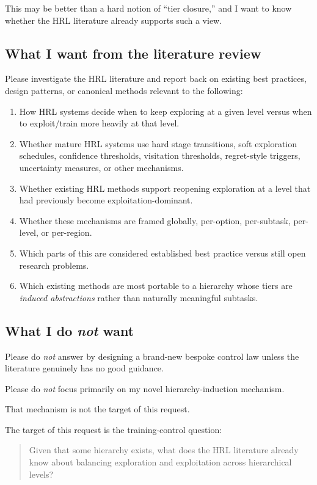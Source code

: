 \documentclass[11pt]{article}
\begin{document}
This may be better than a hard notion of ``tier closure,'' and I want to know whether the HRL literature already supports such a view.

\subsection*{What I want from the literature review}

Please investigate the HRL literature and report back on existing best practices, design patterns, or canonical methods relevant to the following:

\begin{enumerate}
\item How HRL systems decide when to keep exploring at a given level versus when to exploit/train more heavily at that level.
\item Whether mature HRL systems use hard stage transitions, soft exploration schedules, confidence thresholds, visitation thresholds, regret-style triggers, uncertainty measures, or other mechanisms.
\item Whether existing HRL methods support reopening exploration at a level that had previously become exploitation-dominant.
\item Whether these mechanisms are framed globally, per-option, per-subtask, per-level, or per-region.
\item Which parts of this are considered established best practice versus still open research problems.
\item Which existing methods are most portable to a hierarchy whose tiers are \emph{induced abstractions} rather than naturally meaningful subtasks.
\end{enumerate}

\subsection*{What I do \emph{not} want}

Please do \emph{not} answer by designing a brand-new bespoke control law unless the literature genuinely has no good guidance.

Please do \emph{not} focus primarily on my novel hierarchy-induction mechanism.

That mechanism is not the target of this request.

The target of this request is the training-control question:
\begin{quote}
Given that some hierarchy exists, what does the HRL literature already know about balancing exploration and exploitation across hierarchical levels?
\end{quote}
\end{document}
